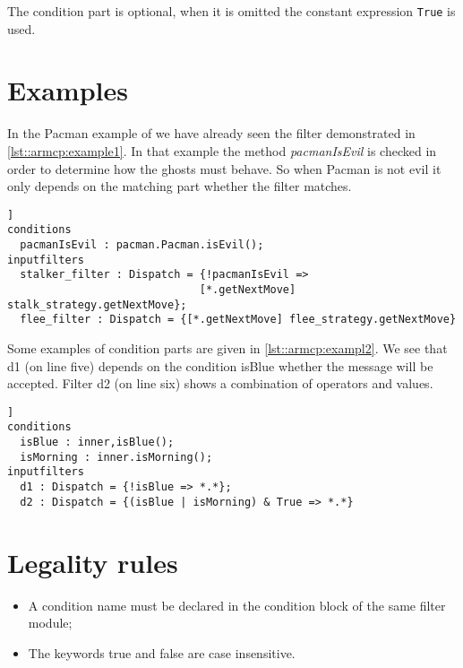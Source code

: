 The condition part is optional, when it is omitted the constant expression \lstinline|True| is used.

\section*{Examples}
In the Pacman example of \cite{Composestar} we have already seen the filter demonstrated in \autoref{lst::armcp:example1}. 
In that example the method \emph{pacmanIsEvil} is checked in order to determine how the ghosts must behave. 
So when Pacman is not evil it only depends on the matching part whether the filter matches.

\begin{lstlisting}[caption={The dymanic strategy filtermodule}, label=lst::armcp:example1,style=listing,language=Composestar,float=[tpb]]
conditions
  pacmanIsEvil : pacman.Pacman.isEvil();
inputfilters
  stalker_filter : Dispatch = {!pacmanIsEvil => 
                              [*.getNextMove] stalk_strategy.getNextMove};
  flee_filter : Dispatch = {[*.getNextMove] flee_strategy.getNextMove}
\end{lstlisting}

Some examples of condition parts are given in \autoref{lst::armcp:exampl2}. 
We see that d1 (on line five) depends on the condition isBlue whether the message will be accepted.
Filter d2 (on line six) shows a combination of operators and values.

\begin{lstlisting}[caption={Possible condition parts}, label=lst::armcp:exampl2,style=listing,language=Composestar,float=[tpb]]
conditions
  isBlue : inner,isBlue();
  isMorning : inner.isMorning();
inputfilters
  d1 : Dispatch = {!isBlue => *.*};
  d2 : Dispatch = {(isBlue | isMorning) & True => *.*}
\end{lstlisting}

\section{Legality rules}
\begin{itemize}[noitemsep]
\item A condition name must be declared in the condition block of the same filter module;
\item The keywords true and false are case insensitive.
\end{itemize}


\comments{}

